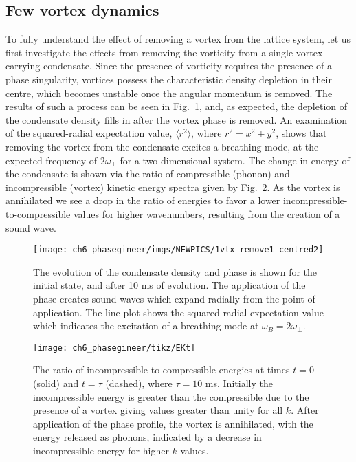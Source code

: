 \subsection{Few vortex dynamics}

To fully understand the effect of removing a vortex from the lattice system, let us first investigate the effects from removing the vorticity from a single vortex carrying condensate. Since the presence of vorticity requires the presence of a phase singularity, vortices possess the characteristic density depletion in their centre, which becomes unstable once the angular momentum is removed. The results of such a process can be seen in Fig.~\ref{fig:annihilation_1vtx}, and, as expected, the depletion of the condensate density fills in after the vortex phase is removed. An examination of the squared-radial expectation value, $\langle r^2 \rangle$, where $r^2 = x^2 + y^2$, shows that removing the vortex from the condensate excites a breathing mode, at the expected frequency of $2\omega_\perp$ for a two-dimensional system. The change in energy of the condensate is shown via the ratio of compressible (phonon) and incompressible (vortex) kinetic energy spectra given by Fig.~\ref{fig:kinspec}. As the vortex is annihilated we see a drop in the ratio of energies to favor a lower incompressible-to-compressible values for higher wavenumbers, resulting from the creation of a sound wave.

\begin{figure} \centering
    \texttt{[image: ch6\_phasegineer/imgs/NEWPICS/1vtx\_remove1\_centred2]}
    \caption{The evolution of the condensate density and phase is shown for the initial state, and after 10 ms of evolution. The application of the phase creates sound waves which expand radially from the point of application. The line-plot shows the squared-radial expectation value which indicates the excitation of a breathing mode at $\omega_B = 2\omega_\perp$.}\label{fig:annihilation_1vtx}
\end{figure}

\begin{figure} \centering
    \texttt{[image: ch6\_phasegineer/tikz/EKt]}
    \caption{The ratio of incompressible to compressible energies at times $t=0$ (solid) and $t=\tau$ (dashed), where $\tau=10$ ms. Initially the incompressible energy is greater than the compressible due to the presence of a vortex giving values greater than unity for all $k$. After application of the phase profile, the vortex is annihilated, with the energy released as phonons, indicated by a decrease in incompressible energy for higher $k$ values.}\label{fig:kinspec}
\end{figure}

